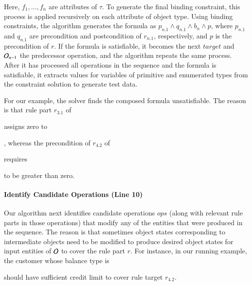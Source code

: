 Here, $f_1, \ldots , f_n$ are attributes of $\tau$. To generate the final
binding constraint, this process is applied recursively on each attribute of
object type. Using binding constraints, the algorithm generates the formula as
$p_{n.1} \wedge q_{n.1} \wedge b_n \wedge p$, where $p_{n.1}$ and $q_{n.1}$ are
precondition and postcondition of $r_{n.1}$, respectively, and $p$ is the
precondition of $r$. If the formula
is satisfiable, it becomes the next $target$ and ${\cal O}_{n-1}$ the
predecessor operation, and the algorithm repeats the same process. After it has
processed all operations in the sequence and the formula is satisfiable, it
extracts values for variables of primitive and enumerated types from the
constraint solution to generate test data.

For our example, the solver finds the composed formula unsatisfiable. The reason
is that rule part $r_{3.1}$ of \subject{CreateOrder} assigns zero to
\subject{Order.total}, whereas the precondition of $r_{4.2}$ of
\subject{GenerateInvoice} requires \subject{total} to be greater than zero.



\paragraph*{Identify Candidate Operations (Line 10)}

Our algorithm next identifies candidate operations $ops$ (along with relevant
rule parts in those operations) that modify any of the entities
that were produced in the sequence. The reason is that sometimes object states 
corresponding to intermediate objects need to be modified to produce desired object states
for input entities of ${\cal O}$ to cover the rule part $r$. 
For instance, in our running example, the customer whose balance type
is \subject{Credit} should have sufficient credit limit to cover rule target $r_{4.2}$.

